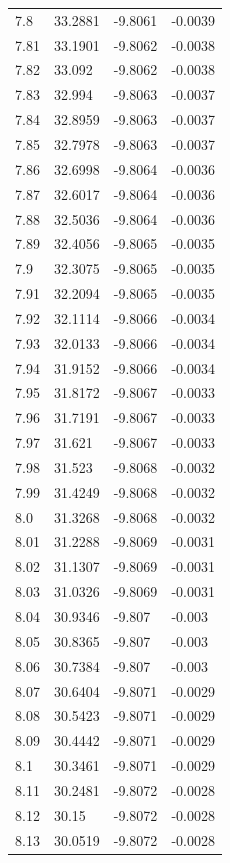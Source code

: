 \begin{tabular}{llll}
7.8 & 33.2881 & -9.8061 & -0.0039 \\
7.81 & 33.1901 & -9.8062 & -0.0038 \\
7.82 & 33.092 & -9.8062 & -0.0038 \\
7.83 & 32.994 & -9.8063 & -0.0037 \\
7.84 & 32.8959 & -9.8063 & -0.0037 \\
7.85 & 32.7978 & -9.8063 & -0.0037 \\
7.86 & 32.6998 & -9.8064 & -0.0036 \\
7.87 & 32.6017 & -9.8064 & -0.0036 \\
7.88 & 32.5036 & -9.8064 & -0.0036 \\
7.89 & 32.4056 & -9.8065 & -0.0035 \\
7.9 & 32.3075 & -9.8065 & -0.0035 \\
7.91 & 32.2094 & -9.8065 & -0.0035 \\
7.92 & 32.1114 & -9.8066 & -0.0034 \\
7.93 & 32.0133 & -9.8066 & -0.0034 \\
7.94 & 31.9152 & -9.8066 & -0.0034 \\
7.95 & 31.8172 & -9.8067 & -0.0033 \\
7.96 & 31.7191 & -9.8067 & -0.0033 \\
7.97 & 31.621 & -9.8067 & -0.0033 \\
7.98 & 31.523 & -9.8068 & -0.0032 \\
7.99 & 31.4249 & -9.8068 & -0.0032 \\
8.0 & 31.3268 & -9.8068 & -0.0032 \\
8.01 & 31.2288 & -9.8069 & -0.0031 \\
8.02 & 31.1307 & -9.8069 & -0.0031 \\
8.03 & 31.0326 & -9.8069 & -0.0031 \\
8.04 & 30.9346 & -9.807 & -0.003 \\
8.05 & 30.8365 & -9.807 & -0.003 \\
8.06 & 30.7384 & -9.807 & -0.003 \\
8.07 & 30.6404 & -9.8071 & -0.0029 \\
8.08 & 30.5423 & -9.8071 & -0.0029 \\
8.09 & 30.4442 & -9.8071 & -0.0029 \\
8.1 & 30.3461 & -9.8071 & -0.0029 \\
8.11 & 30.2481 & -9.8072 & -0.0028 \\
8.12 & 30.15 & -9.8072 & -0.0028 \\
8.13 & 30.0519 & -9.8072 & -0.0028 \\

\end{tabular}
